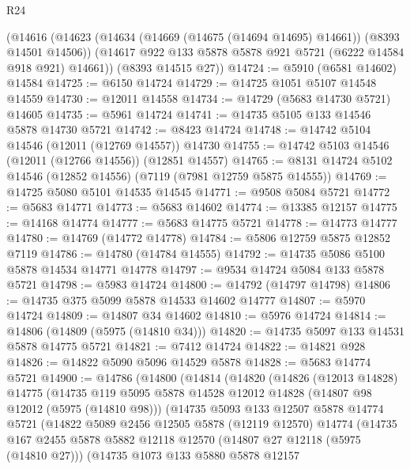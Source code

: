\begin{lexlean}{R24}
\begin{coremodule}
    (@14616
      (@14623
        (@14634 (@14669 (@14675 (@14694 @14695) @14661)) (@8393 @14501 @14506))
        (@14617 @922 @133 @5878 @5878 @921 @5721 (@6222 @14584 @918 @921) @14661))
      (@8393 @14515 @27))
@14724 := @5910 (@6581 @14602) @14584
@14725 := @6150 @14724
@14729 := @14725 @1051 @5107 @14548 @14559
@14730 := @12011 @14558
@14734 := @14729 (@5683 @14730 @5721) @14605
@14735 := @5961 @14724
@14741 := @14735 @5105 @133 @14546 @5878 @14730 @5721
@14742 := @8423 @14724
@14748 := @14742 @5104 @14546 (@12011 (@12769 @14557)) @14730
@14755 := @14742 @5103 @14546 (@12011 (@12766 @14556)) (@12851 @14557)
@14765 := @8131 @14724 @5102 @14546 (@12852 @14556) (@7119 (@7981 @12759 @5875 @14555))
@14769 := @14725 @5080 @5101 @14535 @14545
@14771 := @9508 @5084 @5721
@14772 := @5683 @14771
@14773 := @5683 @14602
@14774 := @13385 @12157
@14775 := @14168 @14774
@14777 := @5683 @14775 @5721
@14778 := @14773 @14777
@14780 := @14769 (@14772 @14778)
@14784 := @5806 @12759 @5875 @12852 @7119
@14786 := @14780 (@14784 @14555)
@14792 := @14735 @5086 @5100 @5878 @14534 @14771 @14778
@14797 := @9534 @14724 @5084 @133 @5878 @5721
@14798 := @5983 @14724
@14800 := @14792 (@14797 @14798)
@14806 := @14735 @375 @5099 @5878 @14533 @14602 @14777
@14807 := @5970 @14724
@14809 := @14807 @34 @14602
@14810 := @5976 @14724
@14814 := @14806 (@14809 (@5975 (@14810 @34)))
@14820 := @14735 @5097 @133 @14531 @5878 @14775 @5721
@14821 := @7412 @14724
@14822 := @14821 @928
@14826 := @14822 @5090 @5096 @14529 @5878
@14828 := @5683 @14774 @5721
@14900 := @14786
    (@14800
      (@14814
        (@14820
          (@14826
            (@12013 @14828)
            @14775
            (@14735
              @119
              @5095
              @5878
              @14528
              @12012
              @14828
              (@14807 @98 @12012 (@5975 (@14810 @98)))
              (@14735
                @5093
                @133
                @12507
                @5878
                @14774
                @5721
                (@14822
                  @5089
                  @2456
                  @12505
                  @5878
                  (@12119 @12570)
                  @14774
                  (@14735
                    @167
                    @2455
                    @5878
                    @5882
                    @12118
                    @12570
                    (@14807 @27 @12118 (@5975 (@14810 @27)))
                    (@14735
                      @1073
                      @133
                      @5880
                      @5878
                      @12157

\end{coremodule}
\end{lexlean}
